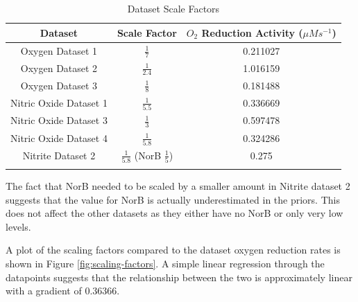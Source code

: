 \begin{table}[!ht]
\begin{center}
\begin{tabular}{ccc}
\toprule
Dataset & Scale Factor & $O_2$ Reduction Activity ($\mu Ms^{-1}$) \\
\midrule
Oxygen Dataset 1 & $\frac{1}{7}$ & 0.211027\\
\noalign{\smallskip}
Oxygen Dataset 2 & $\frac{1}{2.4}$ & 1.016159\\
\noalign{\smallskip}
Oxygen Dataset 3 & $\frac{1}{8}$ & 0.181488\\
\noalign{\smallskip}
Nitric Oxide Dataset 1 & $\frac{1}{5.5}$ & 0.336669\\
\noalign{\smallskip}
Nitric Oxide Dataset 3 & $\frac{1}{3}$ & 0.597478\\
\noalign{\smallskip}
Nitric Oxide Dataset 4 & $\frac{1}{5.8}$ & 0.324286\\
\noalign{\smallskip}
Nitrite Dataset 2 & $\frac{1}{5.8}$ (NorB $\frac{1}{5}$) & 0.275\\
\noalign{\smallskip}
\bottomrule
\end{tabular}
\end{center}
\caption{Dataset Scale Factors
\label{tab:scale-factors}}
\end{table}

The fact that NorB needed to be scaled by a smaller amount in Nitrite dataset 2 suggests that the value for NorB is actually underestimated in the priors. This does not affect the other datasets as they either have no NorB or only very low levels.

A plot of the scaling factors compared to the dataset oxygen reduction rates is shown in Figure \ref{fig:scaling-factors}. A simple linear regression through the datapoints suggests that the relationship between the two is approximately linear with a gradient of $0.36366$.


